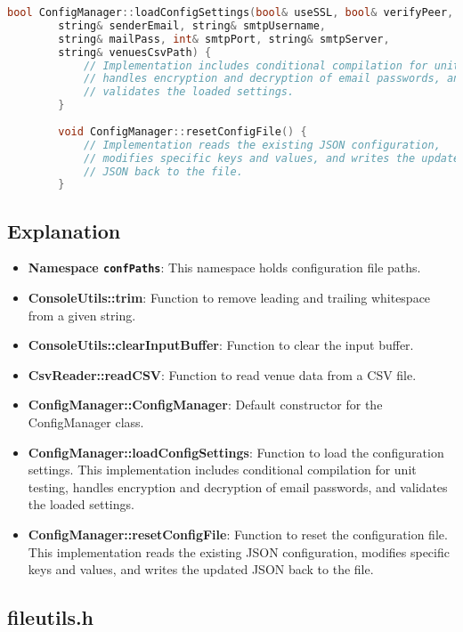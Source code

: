 \documentclass{article}
\begin{document}
\begin{mdframed}[backgroundcolor=background, hidealllines=false, innerleftmargin=15pt, innerrightmargin=5pt, innertopmargin=0pt, innerbottommargin=-5pt]
\begin{lstlisting}[language=C++]
		bool ConfigManager::loadConfigSettings(bool& useSSL, bool& verifyPeer, bool& verifyHost, bool& verbose, 
		string& senderEmail, string& smtpUsername, 
		string& mailPass, int& smtpPort, string& smtpServer, 
		string& venuesCsvPath) {
			// Implementation includes conditional compilation for unit testing, 
			// handles encryption and decryption of email passwords, and 
			// validates the loaded settings.
		}
		
		void ConfigManager::resetConfigFile() {
			// Implementation reads the existing JSON configuration, 
			// modifies specific keys and values, and writes the updated 
			// JSON back to the file.
		}
	\end{lstlisting}
\end{mdframed}
	
	\subsection*{Explanation}
	\begin{itemize}
		\item \textbf{Namespace \texttt{confPaths}}: This namespace holds configuration file paths.
		\item \textbf{ConsoleUtils::trim}: Function to remove leading and trailing whitespace from a given string.
		\item \textbf{ConsoleUtils::clearInputBuffer}: Function to clear the input buffer.
		\item \textbf{CsvReader::readCSV}: Function to read venue data from a CSV file.
		\item \textbf{ConfigManager::ConfigManager}: Default constructor for the ConfigManager class.
		\item \textbf{ConfigManager::loadConfigSettings}: Function to load the configuration settings. This implementation includes conditional compilation for unit testing, handles encryption and decryption of email passwords, and validates the loaded settings.
		\item \textbf{ConfigManager::resetConfigFile}: Function to reset the configuration file. This implementation reads the existing JSON configuration, modifies specific keys and values, and writes the updated JSON back to the file.
	\end{itemize}
	
	\subsection{fileutils.h}
	
\end{document}
